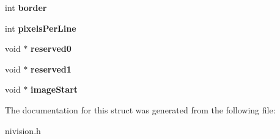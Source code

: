 \begin{DoxyCompactItemize}
\item 
\hypertarget{structImageInfo__struct_a3c0e2c6bb998e950228dcde105c6f8e9}{
int {\bfseries border}}
\label{structImageInfo__struct_a3c0e2c6bb998e950228dcde105c6f8e9}

\item 
\hypertarget{structImageInfo__struct_a5c0b7c23dec1d116ccba53e817bc386f}{
int {\bfseries pixelsPerLine}}
\label{structImageInfo__struct_a5c0b7c23dec1d116ccba53e817bc386f}

\item 
\hypertarget{structImageInfo__struct_ae85c9091b1cfa1dee22172890e0781b6}{
void $\ast$ {\bfseries reserved0}}
\label{structImageInfo__struct_ae85c9091b1cfa1dee22172890e0781b6}

\item 
\hypertarget{structImageInfo__struct_a0e975853abd10bdfc03ffd931a754cd5}{
void $\ast$ {\bfseries reserved1}}
\label{structImageInfo__struct_a0e975853abd10bdfc03ffd931a754cd5}

\item 
\hypertarget{structImageInfo__struct_acc3e5ede3ea4f2f49933a4239c29184d}{
void $\ast$ {\bfseries imageStart}}
\label{structImageInfo__struct_acc3e5ede3ea4f2f49933a4239c29184d}

\end{DoxyCompactItemize}


The documentation for this struct was generated from the following file:\begin{DoxyCompactItemize}
\item 
nivision.h\end{DoxyCompactItemize}
